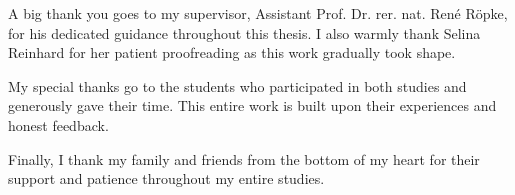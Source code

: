 A big thank you goes to my supervisor, Assistant Prof. Dr. rer. nat. René Röpke, for his dedicated guidance throughout this thesis. I also warmly thank Selina Reinhard for her patient proofreading as this work gradually took shape.

My special thanks go to the students who participated in both studies and generously gave their time. This entire work is built upon their experiences and honest feedback.

Finally, I thank my family and friends from the bottom of my heart for their support and patience throughout my entire studies.